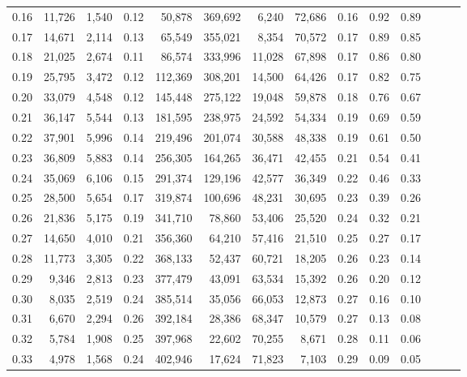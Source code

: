 \begin{tabular}{rrrrrrrrrrrrrr}
0.16 &  11,726 &  1,540 &  0.12 &   50,878 &  369,692 &   6,240 &  72,686 &  0.16 &  0.92 &      0.89 \\
0.17 &  14,671 &  2,114 &  0.13 &   65,549 &  355,021 &   8,354 &  70,572 &  0.17 &  0.89 &      0.85 \\
0.18 &  21,025 &  2,674 &  0.11 &   86,574 &  333,996 &  11,028 &  67,898 &  0.17 &  0.86 &      0.80 \\
0.19 &  25,795 &  3,472 &  0.12 &  112,369 &  308,201 &  14,500 &  64,426 &  0.17 &  0.82 &      0.75 \\
0.20 &  33,079 &  4,548 &  0.12 &  145,448 &  275,122 &  19,048 &  59,878 &  0.18 &  0.76 &      0.67 \\
0.21 &  36,147 &  5,544 &  0.13 &  181,595 &  238,975 &  24,592 &  54,334 &  0.19 &  0.69 &      0.59 \\
0.22 &  37,901 &  5,996 &  0.14 &  219,496 &  201,074 &  30,588 &  48,338 &  0.19 &  0.61 &      0.50 \\
0.23 &  36,809 &  5,883 &  0.14 &  256,305 &  164,265 &  36,471 &  42,455 &  0.21 &  0.54 &      0.41 \\
0.24 &  35,069 &  6,106 &  0.15 &  291,374 &  129,196 &  42,577 &  36,349 &  0.22 &  0.46 &      0.33 \\
0.25 &  28,500 &  5,654 &  0.17 &  319,874 &  100,696 &  48,231 &  30,695 &  0.23 &  0.39 &      0.26 \\
0.26 &  21,836 &  5,175 &  0.19 &  341,710 &   78,860 &  53,406 &  25,520 &  0.24 &  0.32 &      0.21 \\
0.27 &  14,650 &  4,010 &  0.21 &  356,360 &   64,210 &  57,416 &  21,510 &  0.25 &  0.27 &      0.17 \\
0.28 &  11,773 &  3,305 &  0.22 &  368,133 &   52,437 &  60,721 &  18,205 &  0.26 &  0.23 &      0.14 \\
0.29 &   9,346 &  2,813 &  0.23 &  377,479 &   43,091 &  63,534 &  15,392 &  0.26 &  0.20 &      0.12 \\
0.30 &   8,035 &  2,519 &  0.24 &  385,514 &   35,056 &  66,053 &  12,873 &  0.27 &  0.16 &      0.10 \\
0.31 &   6,670 &  2,294 &  0.26 &  392,184 &   28,386 &  68,347 &  10,579 &  0.27 &  0.13 &      0.08 \\
0.32 &   5,784 &  1,908 &  0.25 &  397,968 &   22,602 &  70,255 &   8,671 &  0.28 &  0.11 &      0.06 \\
0.33 &   4,978 &  1,568 &  0.24 &  402,946 &   17,624 &  71,823 &   7,103 &  0.29 &  0.09 &      0.05 \\

\end{tabular}
